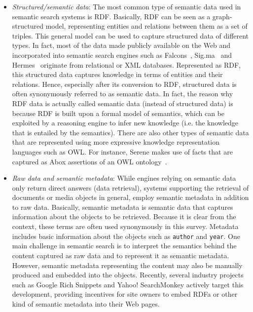 \begin{itemize}
	\item \emph{Structured/semantic data}:  The most common type of semantic data used in semantic search systems is RDF. Basically, RDF can be seen as a graph-structured model, representing entities and relations between them as a set of triples. This general model can be used to capture structured data of different types. In fact, most of the data made publicly available on the Web and incorporated into semantic search engines such as Falcons~\cite{DBLP:journals/ijswis/ChengQ09}, Sig.ma~\cite{DBLP:journals/ws/TummarelloCCDDD10} and Hermes~\cite{DBLP:journals/ws/TranWH09} originate from relational or XML databases. Represented as RDF, this structured data captures knowledge in terms of entities and their relations. Hence, especially after its conversion to RDF, structured data is often synonymously referred to as semantic data. In fact, the reason why RDF data is actually called semantic data (instead of structured data) is because RDF is built upon a formal model of semantics, which can be exploited by a reasoning engine to infer new knowledge (i.e. the knowledge that is entailed by the semantics). There are also other types of semantic data that are represented using more expressive knowledge representation languages such as OWL. For instance, Serene makes use of facts that are captured as Abox assertions of an OWL ontology~\cite{DBLP:journals/ws/FazzingaGGL11}.   	
	
	\item \emph{Raw data and semantic metadata}: While engines relying on semantic data only return direct answers (data retrieval), systems supporting the retrieval of documents or media objects in general, employ semantic metadata in addition to raw data. Basically, semantic metadata is semantic data that captures information about the objects to be retrieved. Because it is clear from the context, these terms are often used synonymously in this survey. Metadata includes basic information about the objects such as \verb+author+ and \verb+year+. One main challenge in semantic search is to interpret the semantics behind the content captured as raw data and to represent it as semantic metadata. However, semantic metadata representing the content may also be manually produced and embedded into the objects. Recently, several industry projects such as Google Rich Snippets and Yahoo! SearchMonkey actively target this development, providing incentives for site owners to embed RDFa or other kind of semantic metadata into their Web pages.  
\end{itemize}


